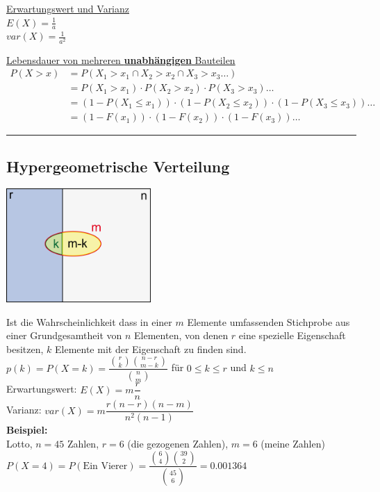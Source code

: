    \begin{minipage}[t]{6cm}
      \underline{Erwartungswert und Varianz}\\
      $E(X)=\frac{1}{a}$\\
      $var(X)=\frac{1}{a^2}$ 
    \end{minipage}
    \begin{minipage}[t]{9cm}
      \underline{Lebensdauer von mehreren \textbf{unabhängigen} Bauteilen}\\
      \begin{align}
        P(X>x) &= P(X_1>x_1 \cap X_2>x_2 \cap X_3>x_3 \ldots) \nonumber \\
        &= P(X_1>x_1) \cdot P(X_2>x_2) \cdot P(X_3>x_3) \ldots \nonumber \\
        &= (1-P(X_1\leq x_1)) \cdot (1-P(X_2\leq x_2)) \cdot (1-P(X_3\leq x_3)) \ldots \nonumber \\
        &= (1-F(x_1)) \cdot (1-F(x_2)) \cdot (1-F(x_3)) \ldots \nonumber
      \end{align}
    \end{minipage}
		
	\hrule

	\subsection{Hypergeometrische Verteilung }
	    \begin{floatingfigure}[r]{5.5cm}
        	\includegraphics[width=5.5cm]{./bilder/hypergeo.png}
        \end{floatingfigure}
        Ist die Wahrscheinlichkeit dass in einer $m$ Elemente umfassenden 
		Stichprobe aus einer Grundgesamtheit von $n$ Elementen, von denen $r$ eine
		spezielle Eigenschaft besitzen, $k$ Elemente mit der Eigenschaft zu
		finden sind.\\
		\vspace{5mm} 
		$p(k)=P(X=k)=\dfrac{\binom r k \binom{n-r}{m-k}}{\binom n m}$ 
        \hspace{10mm} für $0\leq k \leq r$ und $k \leq n$\\
        Erwartungswert: \hspace{10mm} $E(X)=m \dfrac{r}{n}$\\
        Varianz: \hspace{22mm} $var(X)=m \dfrac{r(n-r)(n-m)}{n^2(n-1)}$ \\
		{\bf Beispiel:} \\
		Lotto, $n=45$ Zahlen, $r=6$ (die gezogenen Zahlen), $m=6$
		(meine Zahlen) \\
		$P(X=4)=P(\text{Ein Vierer})=\dfrac{\binom 6 4 \binom {39}
		2}{\binom {45} 6}=0.001364$	\\

